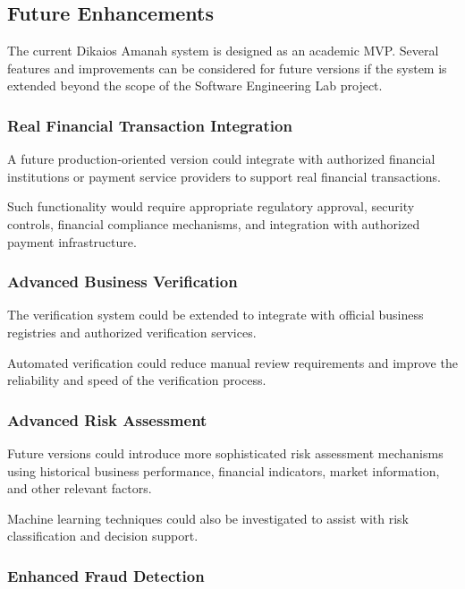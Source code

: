 \subsection{Future Enhancements}

The current Dikaios Amanah system is designed as an academic MVP.
Several features and improvements can be considered for future versions
if the system is extended beyond the scope of the Software Engineering
Lab project.

\subsubsection{Real Financial Transaction Integration}

A future production-oriented version could integrate with authorized
financial institutions or payment service providers to support real
financial transactions.

Such functionality would require appropriate regulatory approval,
security controls, financial compliance mechanisms, and integration with
authorized payment infrastructure.

\subsubsection{Advanced Business Verification}

The verification system could be extended to integrate with official
business registries and authorized verification services.

Automated verification could reduce manual review requirements and
improve the reliability and speed of the verification process.

\subsubsection{Advanced Risk Assessment}

Future versions could introduce more sophisticated risk assessment
mechanisms using historical business performance, financial indicators,
market information, and other relevant factors.

Machine learning techniques could also be investigated to assist with
risk classification and decision support.

\subsubsection{Enhanced Fraud Detection}

